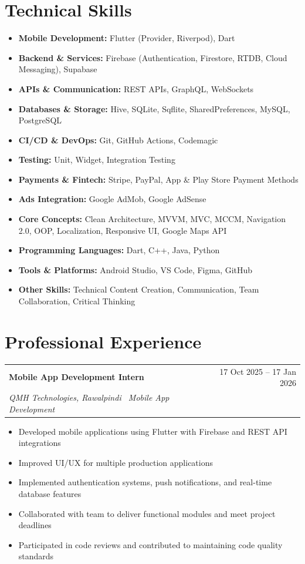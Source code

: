 \documentclass[10pt,a4paper]{article}
\makeatletter
\newcommand{\role}[4]{%
  \vspace{2pt}
  \noindent
  \begin{tabularx}{\textwidth}{@{}X r@{}}
    \textbf{#1} & \textcolor{textgray}{\footnotesize #2} \\
    \textit{\color{textgray}\footnotesize #3} & \textit{\color{textgray}\footnotesize #4} \\
  \end{tabularx}
  \vspace{2pt}
}
\newcommand{\skillitem}[2]{\item \textbf{#1:} #2}
\makeatother
\begin{document}
\section{Technical Skills}
\footnotesize
\begin{itemize}[leftmargin=1.1em, itemsep=1pt, topsep=2pt, parsep=0pt]
  \skillitem{Mobile Development}{Flutter (Provider, Riverpod), Dart}
  \skillitem{Backend \& Services}{Firebase (Authentication, Firestore, RTDB, Cloud Messaging), Supabase}
  \skillitem{APIs \& Communication}{REST APIs, GraphQL, WebSockets}
  \skillitem{Databases \& Storage}{Hive, SQLite, Sqflite, SharedPreferences, MySQL, PostgreSQL}
  \skillitem{CI/CD \& DevOps}{Git, GitHub Actions, Codemagic}
  \skillitem{Testing}{Unit, Widget, Integration Testing}
  \skillitem{Payments \& Fintech}{Stripe, PayPal, App \& Play Store Payment Methods}
  \skillitem{Ads Integration}{Google AdMob, Google AdSense}
  \skillitem{Core Concepts}{Clean Architecture, MVVM, MVC, MCCM, Navigation 2.0, OOP, Localization, Responsive UI, Google Maps API}
  \skillitem{Programming Languages}{Dart, C++, Java, Python}
  \skillitem{Tools \& Platforms}{Android Studio, VS Code, Figma, GitHub}
  \skillitem{Other Skills}{Technical Content Creation, Communication, Team Collaboration, Critical Thinking}
\end{itemize}

\section{Professional Experience}

\role{Mobile App Development Intern}{17 Oct 2025 -- 17 Jan 2026}{QMH Technologies, Rawalpindi \textbar\ Mobile App Development}{}
\footnotesize
\begin{itemize}[leftmargin=1.1em, itemsep=1pt, topsep=2pt, parsep=0pt]
  \item Developed mobile applications using Flutter with Firebase and REST API integrations
  \item Improved UI/UX for multiple production applications
  \item Implemented authentication systems, push notifications, and real-time database features
  \item Collaborated with team to deliver functional modules and meet project deadlines
  \item Participated in code reviews and contributed to maintaining code quality standards
\end{itemize}
\end{document}
